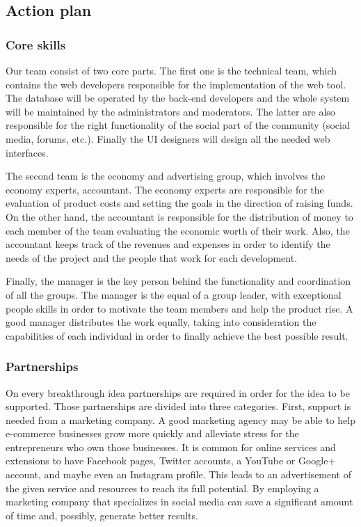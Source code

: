 \subsection{Action plan}

\subsubsection{Core skills}

Our team consist of two core parts.
The first one is the technical team, which contains the web developers 
responsible for the implementation of the web tool. The database will be 
operated by the back-end developers and the whole system will be maintained by 
the administrators and moderators. The latter are also responsible for the right 
functionality of the social part of the community (social media, forums, etc.).
Finally the UI designers will design all the needed web interfaces.

The second team is the economy and advertising group, which involves the economy 
experts, accountant. The economy experts are responsible for the evaluation of 
product costs and setting the goals in the direction of raising funds. On the 
other hand, the accountant is responsible for the distribution of money to each 
member of the team evaluating the economic worth of their work. Also, the 
accountant keeps track of the revenues and expenses in order to identify the 
needs of the project and the people that work for each development.

Finally, the manager is the key person behind the functionality and coordination 
of all the groups. The manager is the equal of a group leader, with exceptional 
people skills in order to motivate the team members and help the product rise. 
A good manager distributes the work equally, taking into consideration the 
capabilities of each individual in order to finally achieve the best possible 
result.

\subsubsection{Partnerships}

On every breakthrough idea partnerships are required in order for the idea to be 
supported. Those partnerships are divided into three categories.
First, support is needed from a marketing company. A good marketing agency may 
be able to help e-commerce businesses grow more quickly and alleviate stress for 
the entrepreneurs who own those businesses. It is common for online services and 
extensions to have Facebook pages, Twitter accounts, a YouTube or Google+ 
account, and maybe even an Instagram profile. This leads to an advertisement of 
the given service and resources to reach its full potential. By employing a 
marketing company that specializes in social media can save a significant amount 
of time and, possibly, generate better results.

